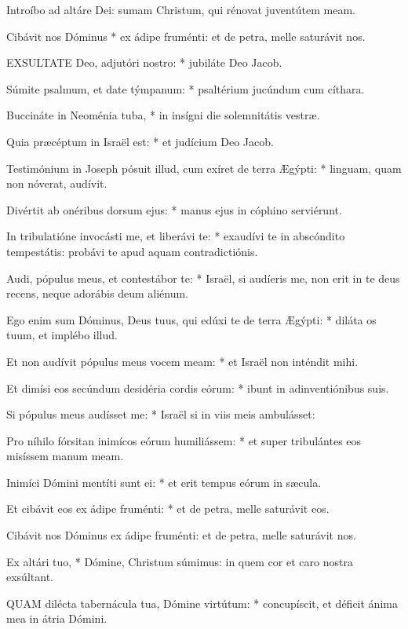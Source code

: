  Introíbo ad altáre Dei: sumam Christum, qui rénovat juventútem meam.

 Cibávit nos Dóminus * ex ádipe fruménti: et de petra, melle saturávit nos.


\lettrine[lines=2]{E}{XSULTATE} Deo, adjutóri nostro: * jubiláte Deo Jacob.

Súmite psalmum, et date týmpanum: * psaltérium jucúndum cum cíthara.

Buccináte in Neoménia tuba, * in insígni die solemnitátis vestræ.

Quia præcéptum in Israël est: * et judícium Deo Jacob.

Testimónium in Joseph pósuit illud, cum exíret de terra Ægýpti: * linguam, quam non nóverat, audívit.

Divértit ab onéribus dorsum ejus: * manus ejus in cóphino serviérunt.

In tribulatióne invocásti me, et liberávi te: * exaudívi te in abscóndito tempestátis: probávi te apud aquam contradictiónis.

Audi, pópulus meus, et contestábor te: * Israël, si audíeris me, non erit in te deus recens, neque adorábis deum aliénum.

Ego enim sum Dóminus, Deus tuus, qui edúxi te de terra Ægýpti: * diláta os tuum, et implébo illud.

Et non audívit pópulus meus vocem meam: * et Israël non inténdit mihi.

Et dimísi eos secúndum desidéria cordis eórum: * ibunt in adinventiónibus suis.

Si pópulus meus audísset me: * Israël si in viis meis ambulásset:

Pro níhilo fórsitan inimícos eórum humiliássem: * et super tribulántes eos misíssem manum meam.

Inimíci Dómini mentíti sunt ei: * et erit tempus eórum in sæcula.

Et cibávit eos ex ádipe fruménti: * et de petra, melle saturávit eos.

 Cibávit nos Dóminus ex ádipe fruménti: et de petra, melle saturávit nos.

 Ex altári tuo, * Dómine, Christum súmimus: in quem cor et caro nostra exsúltant.


\lettrine[lines=2]{Q}{UAM} dilécta tabernácula tua, Dómine virtútum: * concupíscit, et déficit ánima mea in átria Dómini.

